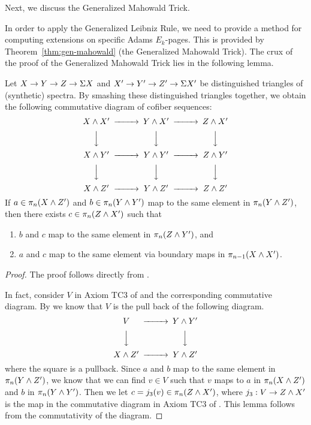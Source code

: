 Next, we discuss the Generalized Mahowald Trick. 

In order to apply the Generalized Leibniz Rule, we need to provide a method for computing extensions on specific Adams $E_k$-pages. This is provided by Theorem~\ref{thm:gen-mahowald} (the Generalized Mahowald Trick). The crux of the proof of the Generalized Mahowald Trick lies in the following lemma.
\begin{lemma}\label{lem:may-smash}
    Let $X\to Y\to Z\to \Sigma X$ and $X'\to Y'\to Z'\to \Sigma X'$ be distinguished triangles of (synthetic) spectra. By smashing these distinguished triangles together, we obtain the following commutative diagram of cofiber sequences:
    $$\begin{CD}
    X\sma X' @>>> Y\sma X' @>>> Z\sma X' \\
    @VVV @VVV @VVV \\
    X\sma Y' @>>> Y\sma Y' @>>> Z\sma Y' \\
    @VVV @VVV @VVV \\
    X\sma Z' @>>> Y\sma Z' @>>> Z\sma Z'
    \end{CD}$$
    If $a\in \pi_n(X\wedge Z')$ and $b\in\pi_n(Y\wedge Y')$ map to the same element in $\pi_n(Y\wedge Z')$, then there exists $c\in \pi_n(Z\wedge X')$ such that
    \begin{enumerate}
        \item $b$ and $c$ map to the same element in $\pi_n(Z\wedge Y')$, and
        \item $a$ and $c$ map to the same element via boundary maps in $\pi_{n-1}(X\wedge X')$.
    \end{enumerate}
\end{lemma}

\begin{proof}
The proof follows directly from \cite[Lemma 4.6]{May01}.

In fact, consider $V$ in Axiom TC3 of \cite[Section 4]{May01} and the corresponding commutative diagram. By \cite[Lemma 4.6]{May01} we know that $V$ is the pull back of the following diagram.
$$\begin{CD}
V @>>> Y\sma Y' \\
@VVV @VVV \\
X\sma Z' @>>> Y\sma Z'
\end{CD}$$
where the square is a pullback.
Since $a$ and $b$ map to the same element in $\pi_n(Y\wedge Z')$, we know that we can find $v\in V$ such that $v$ maps to $a$ in $\pi_n(X\wedge Z')$ and $b$ in $\pi_n(Y\wedge Y')$. Then we let $c=j_3(v)\in \pi_n(Z\wedge X')$, where $j_3: V \rightarrow Z \wedge X'$ is the map in the commutative diagram in Axiom TC3 of \cite[Section 4]{May01}. This lemma follows from the commutativity of the diagram.
\end{proof}
 
